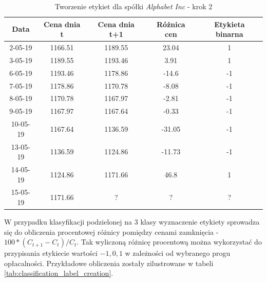 \documentclass[a4paper, twoside, 11pt, openright]{article}
\begin{document}
 \begin{table}[H]
    \centering
    \begin{tabular}{|c|c|c|c|c|}
    \hline
        \textbf{Data}  & \textbf{Cena dnia t} & \textbf{Cena dnia t+1} & \textbf{Różnica cen} & \textbf{Etykieta binarna} \\ \hline
            2-05-19 & 1166.51 & 1189.55 & 23.04 & 1 \\ \hline
            3-05-19 & 1189.55 & 1193.46 & 3.91 & 1 \\ \hline
            6-05-19 & 1193.46 & 1178.86 & -14.6 & -1 \\ \hline
            7-05-19 & 1178.86 & 1170.78 & -8.08 & -1\\ \hline
            8-05-19 & 1170.78 & 1167.97 & -2.81 & -1\\ \hline
            9-05-19 & 1167.97 & 1167.64 & -0.33 & -1\\ \hline
            10-05-19 & 1167.64 & 1136.59 & -31.05 & -1\\ \hline
            13-05-19 & 1136.59 & 1124.86 & -11.73 & -1\\ \hline
            14-05-19 & 1124.86 & 1171.66 & 46.8 & 1\\ \hline 
            15-05-19 & 1171.66 & ?      & ? & ? \\ \hline
    \end{tabular}
    \caption{Tworzenie etykiet dla spółki \textit{Alphabet Inc} - krok 2}
    \label{tab:binary_label_creation}
\end{table} 

 W przypadku klasyfikacji podzielonej na 3 klasy wyznaczenie etykiety sprowadza się do obliczenia procentowej różnicy pomiędzy cenami zamknięcia - $100*(C_{t+1}-C_t)/C_t$. Tak wyliczoną różnicę procentową można wykorzystać do przypisania etykiecie wartości $-1, 0, 1$ w zależności od wybranego progu opłacalności. Przykładowe obliczenia zostały zilustrowane w tabeli \ref{tab:classification_label_creation}.
\end{document}
